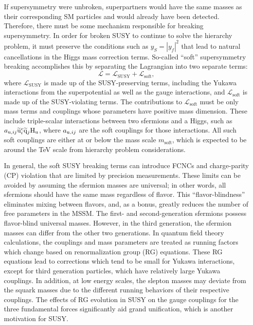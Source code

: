 \documentclass[12pt]{thesis}  %
\begin{document}
If supersymmetry were unbroken, superpartners would have the same masses as their corresponding SM particles and would already have been detected. Therefore, there must be some mechanism responsible for breaking supersymmetry. In order for broken SUSY to continue to solve the hierarchy problem, it must preserve the conditions such as $y_{S} = |y_{f}|^2$ that lead to natural cancellations in the Higgs mass correction terms. So-called ``soft'' supersymmetry breaking accomplishes this by separating the Lagrangian into two separate terms:
\begin{equation}
\mathcal{L} = \mathcal{L}_{\text{SUSY}} + \mathcal{L}_{\text{soft}},
\end{equation}
where $\mathcal{L}_{\text{SUSY}}$ is made up of the SUSY-preserving terms, including the Yukawa interactions from the superpotential as well as the gauge interactions, and $\mathcal{L}_{\text{soft}}$ is made up of the SUSY-violating terms. The contributions to $\mathcal{L}_{\text{soft}}$ must be only mass terms and couplings whose parameters have positive mass dimension. These include triple-scalar interactions between two sfermions and a Higgs, such as $a_{\mathrm{u},ij} \widetilde{\mathrm{u}}_{i}^{c} \widetilde{\mathrm{q}}_{j} \mathrm{H}_\mathrm{u}$, where $a_{\mathrm{u},ij}$ are the soft couplings for those interactions. All such soft couplings are either at or below the mass scale $m_{\text{soft}}$, which is expected to be around the TeV scale from hierarchy problem considerations.

In general, the soft SUSY breaking terms can introduce FCNCs and charge-parity (CP) violation that are limited by precision measurements. These limits can be avoided by assuming the sfermion masses are universal; in other words, all sfermions should have the same mass regardless of flavor. This ``flavor-blindness'' eliminates mixing between flavors, and, as a bonus, greatly reduces the number of free parameters in the MSSM. The first- and second-generation sfermions possess flavor-blind universal masses. However, in the third generation, the sfermion masses can differ from the other two generations. In quantum field theory calculations, the couplings and mass parameters are treated as running factors which change based on renormalization group (RG) equations. These RG equations lead to corrections which tend to be small for Yukawa interactions, except for third generation particles, which have relatively large Yukawa couplings. In addition, at low energy scales, the slepton masses may deviate from the squark masses due to the different running behaviors of their respective couplings. The effects of RG evolution in SUSY on the gauge couplings for the three fundamental forces significantly aid grand unification, which is another motivation for SUSY.
\end{document}
